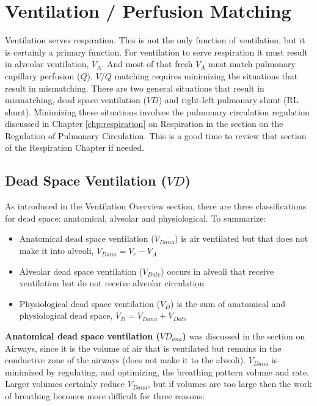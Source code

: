 \section{Ventilation / Perfusion Matching}

Ventilation serves respiration. This is not the only function of ventilation, but it is certainly a primary function. For ventilation to serve respiration it must result in alveolar ventilation, $V_A$. And most of that fresh $V_A$ must match pulmonary capillary perfusion ($Q$). $V/Q$ matching requires minimizing the situations that result in mismatching. There are two general situations that result in mismatching, dead space ventilation ($VD$) and right-left pulmonary shunt (RL shunt). Minimizing these situations involves the pulmonary circulation regulation discussed in Chapter \ref{chp:respiration} on Respiration in the section on the Regulation of Pulmonary Circulation. This is a good time to review that section of the Respiration Chapter if needed.

\subsection{Dead Space Ventilation ($VD$)}

As introduced in the Ventilation Overview section, there are three classifications for dead space: anatomical, alveolar and physiological.  
\vspace{3mm}
To summarize:
\begin{itemize}
       \item Anatomical dead space ventilation ($V_{Dana}$) is air ventilated but that does not make it into alveoli, $V_{Dana} = V_e - V_A$
    \item Alveolar dead space ventilation ($V_{Dalv}$) occurs in alveoli that receive ventilation but do not receive alveolar circulation
    \item Physiological dead space ventilation ($V_D$) is the sum of anatomical and physiological dead space, $V_D = V_{Dana} + V_{Dalv}$
\end{itemize}

\textbf{Anatomical dead space ventilation ($VD_{ana}$)} was discussed in the section on Airways, since it is the volume of air that is ventilated but remains in the conductive zone of the airways (does not make it to the alveoli). $V_{Dana}$ is minimized by regulating, and optimizing, the breathing pattern volume and rate. Larger volumes certainly reduce $V_{Dana}$, but if volumes are too large then the work of breathing becomes more difficult for three reasons:

